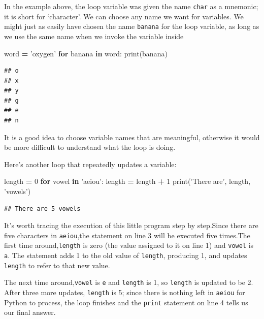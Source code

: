 \documentclass[]{book}
\newenvironment{Shaded}{\begin{snugshade}}{\end{snugshade}}
\newcommand{\BuiltInTok}[1]{#1}
\newcommand{\ControlFlowTok}[1]{\textcolor[rgb]{0.13,0.29,0.53}{\textbf{#1}}}
\newcommand{\DecValTok}[1]{\textcolor[rgb]{0.00,0.00,0.81}{#1}}
\newcommand{\KeywordTok}[1]{\textcolor[rgb]{0.13,0.29,0.53}{\textbf{#1}}}
\newcommand{\NormalTok}[1]{#1}
\newcommand{\OperatorTok}[1]{\textcolor[rgb]{0.81,0.36,0.00}{\textbf{#1}}}
\newcommand{\StringTok}[1]{\textcolor[rgb]{0.31,0.60,0.02}{#1}}
\theoremstyle{definition}
\theoremstyle{definition}
\theoremstyle{definition}
\theoremstyle{remark}
\begin{document}
In the example above, the loop variable was given the name \texttt{char}
as a mnemonic; it is short for `character'. We can choose any name we
want for variables. We might just as easily have chosen the name
\texttt{banana} for the loop variable, as long as we use the same name
when we invoke the variable inside

\begin{Shaded}
\begin{Highlighting}[]
\NormalTok{word }\OperatorTok{=} \StringTok{'oxygen'}
\ControlFlowTok{for}\NormalTok{ banana }\KeywordTok{in}\NormalTok{ word:}
    \BuiltInTok{print}\NormalTok{(banana)}
\end{Highlighting}
\end{Shaded}

\begin{verbatim}
## o
## x
## y
## g
## e
## n
\end{verbatim}

It is a good idea to choose variable names that are meaningful,
otherwise it would be more difficult to understand what the loop is
doing.

Here's another loop that repeatedly updates a variable:

\begin{Shaded}
\begin{Highlighting}[]
\NormalTok{length }\OperatorTok{=} \DecValTok{0}
\ControlFlowTok{for}\NormalTok{ vowel }\KeywordTok{in} \StringTok{'aeiou'}\NormalTok{:}
\NormalTok{    length }\OperatorTok{=}\NormalTok{ length }\OperatorTok{+} \DecValTok{1}
\BuiltInTok{print}\NormalTok{(}\StringTok{'There are'}\NormalTok{, length, }\StringTok{'vowels'}\NormalTok{)}
\end{Highlighting}
\end{Shaded}

\begin{verbatim}
## There are 5 vowels
\end{verbatim}

It's worth tracing the execution of this little program step by
step.Since there are five characters in
\texttt{\textquotesingle{}aeiou\textquotesingle{}},the statement on line
3 will be executed five times.The first time around,\texttt{length} is
zero (the value assigned to it on line 1) and \texttt{vowel} is
\texttt{\textquotesingle{}a\textquotesingle{}}. The statement adds 1 to
the old value of \texttt{length}, producing 1, and updates
\texttt{length} to refer to that new value.

The next time around,\texttt{vowel} is
\texttt{\textquotesingle{}e\textquotesingle{}} and \texttt{length} is 1,
so \texttt{length} is updated to be 2. After three more updates,
\texttt{length} is 5; since there is nothing left in
\texttt{\textquotesingle{}aeiou\textquotesingle{}} for Python to
process, the loop finishes and the \texttt{print} statement on line 4
tells us our final answer.
\end{document}
